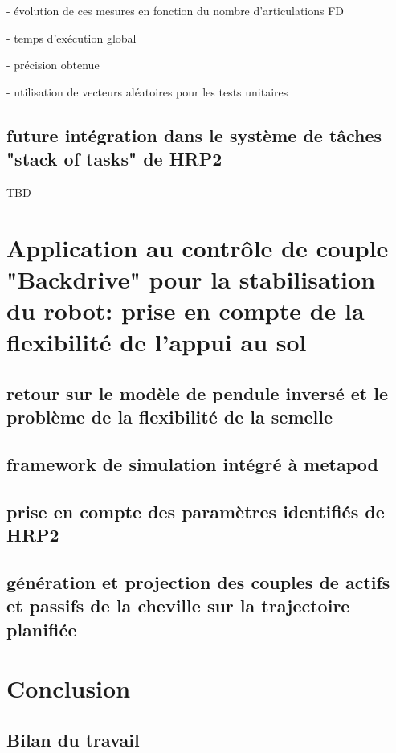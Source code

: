 \documentclass{report}
\begin{document}
- évolution de ces mesures en fonction du nombre d'articulations FD

- temps d'exécution global

- précision obtenue

- utilisation de vecteurs aléatoires pour les tests unitaires

\section{future intégration dans le système de tâches "stack of tasks" de HRP2}

TBD

\chapter{Application au contrôle de couple "Backdrive" pour la stabilisation du robot: prise en compte de la flexibilité de l'appui au sol}

\section{retour sur le modèle de pendule inversé et le problème de la flexibilité de la semelle}

\section{framework de simulation intégré à metapod}

\section{prise en compte des paramètres identifiés de HRP2}

\section{génération et projection des couples de actifs et passifs de la cheville sur la trajectoire planifiée}


\chapter*{Conclusion}
%

\section*{Bilan du travail}
\end{document}
